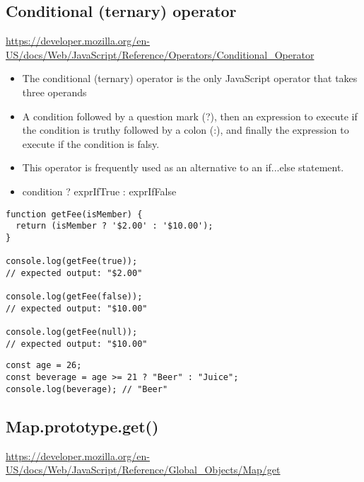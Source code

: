 \documentclass[10pt]{article}
\begin{document}
\medskip %
\pagebreak
\subsection{Conditional (ternary) operator}

\url{https://developer.mozilla.org/en-US/docs/Web/JavaScript/Reference/Operators/Conditional_Operator}

\begin{itemize}
	\item The conditional (ternary) operator is the only JavaScript operator that takes three operands
	\item A condition followed by a question mark (?), then an expression to execute if the condition is truthy followed by a colon (:), and finally the expression to execute if the condition is falsy.
	\item This operator is frequently used as an alternative to an if...else statement.
	\item condition ? exprIfTrue : exprIfFalse
\end{itemize}

\begin{lstlisting}[title=Example ternary operator, captionpos=t]
function getFee(isMember) {
  return (isMember ? '$2.00' : '$10.00');
}

console.log(getFee(true));
// expected output: "$2.00"

console.log(getFee(false));
// expected output: "$10.00"

console.log(getFee(null));
// expected output: "$10.00"
\end{lstlisting}


\begin{lstlisting}[title=Example ternary operator, captionpos=t]
const age = 26;
const beverage = age >= 21 ? "Beer" : "Juice";
console.log(beverage); // "Beer"
\end{lstlisting}
\medskip %














\medskip %
\pagebreak
\subsection{Map.prototype.get()}

\url{https://developer.mozilla.org/en-US/docs/Web/JavaScript/Reference/Global_Objects/Map/get}
\end{document}
